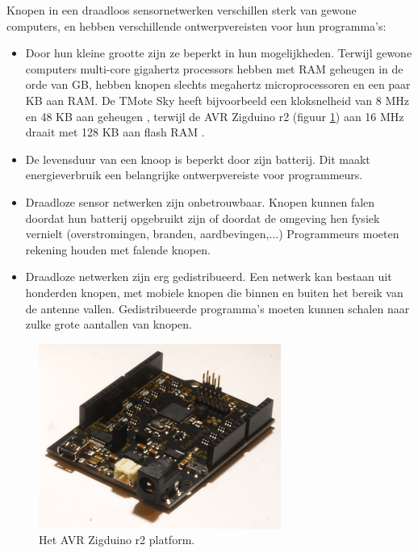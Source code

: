 \documentclass[journal]{IEEEtran}
\begin{document}
Knopen in een draadloos sensornetwerken verschillen sterk van gewone computers, en hebben verschillende ontwerpvereisten voor hun programma's:
\begin{itemize}
\item Door hun kleine grootte zijn ze beperkt in hun mogelijkheden. Terwijl gewone computers multi-core gigahertz processors hebben met RAM geheugen in de orde van GB, hebben knopen slechts megahertz microprocessoren en een paar KB aan RAM. De TMote Sky heeft bijvoorbeeld een kloksnelheid van 8 MHz en 48 KB aan geheugen \cite{tmote-sky-manual}, terwijl de AVR Zigduino r2 (figuur \ref{fig:context:zigduino}) aan 16 MHz draait met 128 KB aan flash RAM \cite{zigduino-manual}.
\item De levensduur van een knoop is beperkt door zijn batterij. Dit maakt energieverbruik een belangrijke ontwerpvereiste voor programmeurs.
\item Draadloze sensor netwerken zijn onbetrouwbaar. Knopen kunnen falen doordat hun batterij opgebruikt zijn of doordat de omgeving hen fysiek vernielt (overstromingen, branden, aardbevingen,...) Programmeurs moeten rekening houden met falende knopen.
\item Draadloze netwerken zijn erg gedistribueerd. Een netwerk kan bestaan uit honderden knopen, met mobiele knopen die binnen en buiten het bereik van de antenne vallen. Gedistribueerde programma's moeten kunnen schalen naar zulke grote aantallen van knopen.
\end{itemize}

\begin{figure}
	\centering
	\includegraphics[width=\linewidth]{images/zigduino-r2.png}
	\caption{Het AVR Zigduino r2 platform. \cite{zigduino-manual}}
	\label{fig:context:zigduino}
\end{figure}
\end{document}
